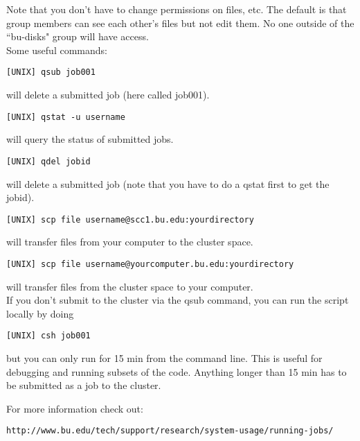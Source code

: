 \documentclass{article}
\begin{document}
Note that you don't have to change permissions on files, etc.  The default is that group members can see each other's files but not edit them.  No one outside of the ``bu-disks" group will have access.\\

\noindent Some useful commands:

\vspace{2mm}
\texttt{[UNIX] qsub job001}
\vspace{2mm}

\noindent will delete a submitted job (here called job001).

\vspace{2mm}
\texttt{[UNIX] qstat -u username}
\vspace{2mm}

\noindent will query the status of submitted jobs.


\vspace{2mm}
\texttt{[UNIX] qdel jobid}
\vspace{2mm}

\noindent will delete a submitted job (note that you have to do a qstat first to get the jobid).

\vspace{2mm}
\texttt{[UNIX] scp file username@scc1.bu.edu:yourdirectory}
\vspace{2mm}

\noindent will transfer files from your computer to the cluster space.

\vspace{2mm}
\texttt{[UNIX] scp file username@yourcomputer.bu.edu:yourdirectory}
\vspace{2mm}

\noindent will transfer files from the cluster space to your computer.\\

If you don't submit to the cluster via the qsub command, you can run the script locally by doing

\vspace{2mm}
\texttt{[UNIX] csh job001}
\vspace{2mm}

\noindent but you can only run for 15 min from the command line.  This is useful for debugging and running subsets of the code. Anything longer than 15 min has to be submitted as a job to the cluster.

\noindent For more information check out:

\vspace{2mm}
\texttt{http://www.bu.edu/tech/support/research/system-usage/running-jobs/}
\vspace{2mm}
\end{document}
